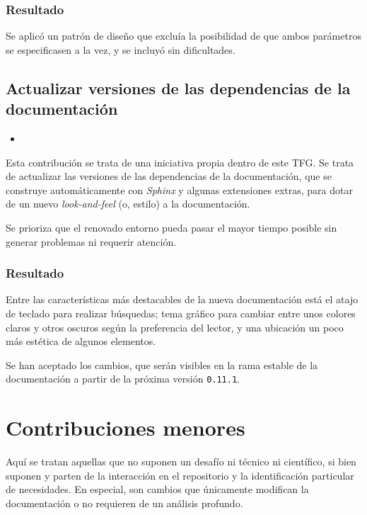 \subsubsection{Resultado}

Se aplicó un patrón de diseño que excluía la posibilidad de que ambos parámetros se especificasen a la vez, y se incluyó sin dificultades.

\subsection{Actualizar versiones de las dependencias de la documentación}

\begin{itemize}
    \item {}
\end{itemize}

Esta contribución se trata de una iniciativa propia dentro de este TFG. Se trata de actualizar las versiones de las dependencias de la documentación, que se construye automáticamente con \textit{Sphinx} y algunas extensiones extras, para dotar de un nuevo \textit{look-and-feel} (o, estilo) a la documentación.

Se prioriza que el renovado entorno pueda pasar el mayor tiempo posible sin generar problemas ni requerir atención.

\subsubsection{Resultado}

Entre las características más destacables de la nueva documentación está el atajo de teclado para realizar búsquedas; tema gráfico para cambiar entre unos colores claros y otros oscuros según la preferencia del lector, y una ubicación un poco más estética de algunos elementos.

Se han aceptado los cambios, que serán visibles en la \gls{rama} estable de la documentación a partir de la próxima versión \texttt{0.11.1}.

\section{Contribuciones menores} \label{sct:desarrollo:contribuciones_menores}

Aquí se tratan aquellas que no suponen un desafío ni técnico ni científico, si bien suponen y parten de la interacción en el \gls{repositorio} y la identificación particular de necesidades. En especial, son cambios que únicamente modifican la documentación o no requieren de un análisis profundo.

